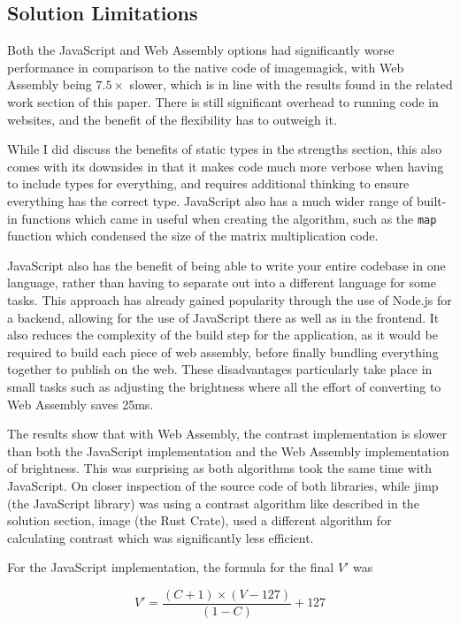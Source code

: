 \documentclass[12pt,a4paper]{article}
\begin{document}
\subsection{Solution Limitations}

Both the JavaScript and Web Assembly options had significantly worse performance in comparison to the native code of imagemagick, with Web Assembly being $7.5 \times$ slower, which is in line with the results found in the related work section of this paper. There is still significant overhead to running code in websites, and the benefit of the flexibility has to outweigh it.

While I did discuss the benefits of static types in the strengths section, this also comes with its downsides in that it makes code much more verbose when having to include types for everything, and requires additional thinking to ensure everything has the correct type. JavaScript also has a much wider range of built-in functions which came in useful when creating the algorithm, such as the \texttt{map} function which condensed the size of the matrix multiplication code.

JavaScript also has the benefit of being able to write your entire codebase in one language, rather than having to separate out into a different language for some tasks. This approach has already gained popularity through the use of Node.js for a backend, allowing for the use of JavaScript there as well as in the frontend. It also reduces the complexity of the build step for the application, as it would be required to build each piece of web assembly, before finally bundling everything together to publish on the web. These disadvantages particularly take place in small tasks such as adjusting the brightness where all the effort of converting to Web Assembly saves 25ms.


The results show that with Web Assembly, the contrast implementation is slower than both the JavaScript implementation and the Web Assembly implementation of brightness. This was surprising as both algorithms took the same time with JavaScript. On closer inspection of the source code of both libraries, while jimp (the JavaScript library) was using a contrast algorithm like described in the solution section, image (the Rust Crate), used a different algorithm for calculating contrast which was significantly less efficient.

For the JavaScript implementation, the formula for the final $V'$ was

$$
    V'=\frac{(C+1)\times (V-127)}{(1-C)}+127
$$
\end{document}
